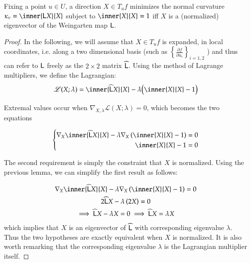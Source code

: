         \begin{theorem}
        	Fixing a point $u \in U$, a direction $X \in T_u f $ minimizes the normal curvature $\kappa_\nu = \inner{\wein X}{X}$ subject to $\inner{X}{X}= 1$
        	iff $X$ is a (normalized) eigenvector of the Weingarten map $\mathsf{L}$.
        	\end{theorem}
        \begin{proof}
        		
        		In the following, we will assume that $X \in T_u f$ is expanded,
        		in local coordinates, i.e. along  a two dimensional basis
        		(such as $\left\{ \frac{\partial f}{\partial u_i}\right\}_{i=1,2}$
        		) and thus can refer to $\mathsf{L}$ freely as the $2\times2$ matrix $\widehat{\mathsf{L}}$.
        		Using the method of Lagrange multipliers, we define the Lagrangian:
        		\begin{equation}
        		\mathscr{L}(X; \lambda) =
	        	\inner{\weinmat X}{X} - \lambda\Big(\inner{X}{X} - 1\Big) 
	        \end{equation}
	        	
	        	Extremal values occur when
	        	$\nabla_{X,\lambda} \mathscr{L}(X;\lambda) = 0$,
	        	which becomes the two equations
	        	
	        \begin{equation}
	        \left\{ \begin{aligned}
		        \nabla_X \inner{\weinmat X}{X} - \lambda \nabla_X \left( \inner{X}{X} - 1 \right) = 0 \\
		        \inner{X}{X} - 1 = 0
	        \end{aligned} \right.
	        \end{equation}
	        
	        The second requirement is simply the constraint that $X$ is normalized.
	        Using the previous lemma, we can simplify the first result as follows:
	        
	        \begin{gather}
	        \nabla_X \inner{\weinmat X}{X} - \lambda \nabla_X \left( \inner{X}{X} - 1 \right) = 0 \\
	        2\weinmat X - \lambda \left(2 X \right) = 0 \\
	        \implies \weinmat X - \lambda X = 0 \implies \weinmat X = \lambda X
	        \end{gather}
	        which implies that $X$ is an eigenvector of  $\widehat{\mathsf{L}}$ with corresponding eigenvalue $\lambda$.
	        Thus the two hypotheses are exactly equivalent when $X$ is normalized. It is also worth remarking that the corresponding eigenvalue $\lambda$ is the Lagrangian multiplier itself.
        	\end{proof}
        	
